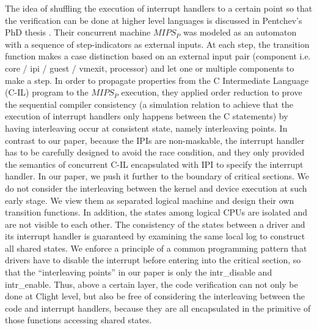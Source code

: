 The idea of shuffling the execution of interrupt handlers to a certain point
so that the verification can be done at higher level languages is discussed in
Pentchev's PhD thesis \cite{Pentchev:2016}. Their concurrent machine $MIPS_{P}$
was modeled as an
automaton with a sequence of step-indicators as external inputs. At each step,
the transition function makes a case distinction based on an external input
pair (component i.e. core / ipi / guest / vmexit, processor) and let one or
multiple components to make a step. In order to propagate properties from the C
Intermediate Language (C-IL) program to the $MIPS_{P}$ execution, they applied
order reduction to prove the sequential compiler consistency (a simulation
relation to achieve that the execution of interrupt handlers only happens
between the C statements) by having interleaving occur at consistent state,
namely interleaving points. In contrast to our paper, because the IPIs are
non-maskable, the interrupt handler has to be carefully designed to avoid the
race condition, and they only provided the semantics of concurrent C-IL
encapsulated with IPI to specify the interrupt handler. In our paper, we push
it further to the boundary of critical sections. We do not consider the
interleaving between the kernel and device execution at such early stage. We
view them as separated logical machine and design their own transition functions.
In addition, the states among logical CPUs are isolated and are not visible
to each other. The consistency of the states between a driver and its
interrupt handler is guaranteed by examining the same local log to construct
all shared states. We enforce a principle of a common programming pattern that
drivers have to disable the interrupt before entering into the critical section,
so that the ``interleaving points'' in our paper is only the \textsf{intr\_disable} and
\textsf{intr\_enable}. Thus, above a certain layer, the code verification can not only
be done at Clight level, but also be free of considering the interleaving between
the code and interrupt handlers, because they are all encapsulated in the primitive of
those functions accessing shared states.

